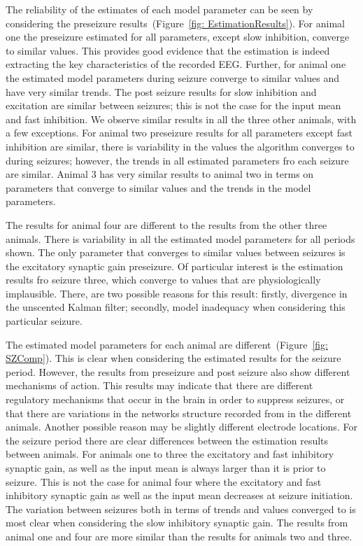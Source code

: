 The reliability of the estimates of each model parameter can be seen by considering the preseizure results~(Figure~\ref{fig: EstimationResults}). For animal one the preseizure estimated for all parameters, except slow inhibition, converge to similar values. This provides good evidence that the estimation is indeed extracting the key characteristics of the recorded EEG. Further, for animal one the estimated model parameters during seizure converge to similar values and have very similar trends. The post seizure results for slow inhibition and excitation are similar between seizures; this is not the case for the input mean and fast inhibition. We observe similar results in all the three other animals, with a few exceptions. For animal two preseizure results for all parameters except fast inhibition are similar, there is variability in the values the algorithm converges to during seizures; however, the trends in all estimated parameters fro each seizure are similar. Animal 3 has very similar results to animal two in terms on parameters that converge to similar values and the trends in the model parameters. 

The results for animal four are different to the results from the other three animals. There is variability in all the estimated model parameters for all periods shown. The only parameter that converges to similar values between seizures is the excitatory synaptic gain preseizure. Of particular interest is the estimation results fro seizure three, which converge to values that are physiologically implausible. There, are two possible reasons for this result: firstly, divergence in the unscented Kalman filter; secondly, model inadequacy when considering this particular seizure. 

The estimated model parameters for each animal are different~(Figure~\ref{fig: SZComp}). This is clear when considering the estimated results for the seizure period. However, the results from preseizure and post seizure also show different mechanisms of action. This results may indicate that there are different regulatory mechanisms that occur in the brain in order to suppress seizures, or that there are variations in the networks structure recorded from in the different animals. Another possible reason may be slightly different electrode locations. For the seizure period there are clear differences between the estimation results between animals. For animals one to three the excitatory and fast inhibitory synaptic gain, as well as the input mean is always larger than it is prior to seizure. This is not the case for animal four where the excitatory and fast inhibitory synaptic gain as well as the input mean decreases at seizure initiation. The variation between seizures both in terms of trends and values converged to is most clear when considering the slow inhibitory synaptic gain. The results from animal one and four are more similar than the results for animals two and three. 

